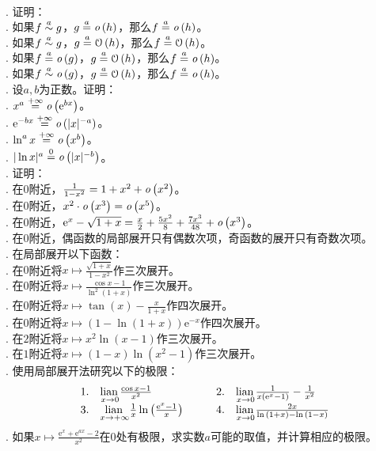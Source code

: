 \documentclass[12pt,UTF8,fontset=none]{ctexbook}
\begin{document}
\begin{xt}
    \mbox{} \\
    . 证明：\\
    . 如果$f \overset{a}{\sim} g$，$g \overset{a}{=} \mathit{o}\left(h\right)$，那么$f \overset{a}{=} \mathit{o}\left(h\right)$。\\
    . 如果$f \overset{a}{\sim} g$，$g \overset{a}{=} \mathcal{O}\left(h\right)$，那么$f \overset{a}{=} \mathcal{O}\left(h\right)$。\\
    . 如果$f \overset{a}{=} \mathit{o}\left(g\right)$，$g \overset{a}{=} \mathcal{O}\left(h\right)$，那么$f \overset{a}{=} \mathit{o}\left(h\right)$。\\
    . 如果$f \overset{a}{\sim} \mathit{o}\left(g\right)$，$g \overset{a}{=} \mathcal{O}\left(h\right)$，那么$f \overset{a}{=} \mathit{o}\left(h\right)$。\\
    . 设$a, b$为正数。证明：\\
    . $x^a \overset{+\infty}{=} \mathit{o}\left(\mathrm{e}^{bx}\right)$。\\
    . $\mathrm{e}^{-bx} \overset{+\infty}{=} \mathit{o}\left(|x|^{-a}\right)$。\\
    . $\ln^{a}{x} \overset{+\infty}{=} \mathit{o}\left(x^{b}\right)$。\\
    . $|\ln{x}|^{a} \overset{0}{=} \mathit{o}\left(|x|^{-b}\right)$。\\
    . 证明：\\
    . 在$0$附近，$\frac{1}{1 - x^2} = 1 + x^2 + \mathit{o}\left(x^2\right)$。\\
    . 在$0$附近，$x^2 \cdot \mathit{o}\left(x^3\right) = \mathit{o}\left(x^5\right)$。\\
    . 在$0$附近，$\mathrm{e}^x - \sqrt{1 + x} = \frac{x}{2} + \frac{5x^2}{8} + \frac{7x^3}{48} + \mathit{o}\left(x^3\right)$。\\
    . 在$0$附近，偶函数的局部展开只有偶数次项，奇函数的展开只有奇数次项。\\
    . 在局部展开以下函数：\\
    . 在$0$附近将$x\mapsto \frac{\sqrt{1 + x}}{1 - x^2}$作三次展开。\\
    . 在$0$附近将$x\mapsto \frac{\cos{x} - 1}{\ln^2{(1 + x)}}$作三次展开。\\
    . 在$0$附近将$x\mapsto \tan{(x)} - \frac{x}{1 + x}$作四次展开。\\
    . 在$0$附近将$x\mapsto (1 - \ln{(1 + x)})\mathrm{e}^{-x}$作四次展开。\\
    . 在$2$附近将$x\mapsto x^2\ln{(x - 1)}$作三次展开。\\
    . 在$1$附近将$x\mapsto (1 - x)\ln{(x^2 - 1)}$作三次展开。\\
    . 使用局部展开法研究以下的极限：\\
    $$
    \begin{array}{ll}
        1. \quad \underset{x\to 0}{\operatorname{lian}\,} \frac{\cos{x} - 1}{x^2} & \qquad 2. \quad \underset{x\to 0}{\operatorname{lian}\,} \frac{1}{x \left(\mathrm{e}^x - 1\right)} - \frac{1}{x^2} \\
        3. \quad \underset{x\to +\infty}{\operatorname{lian}\,} \frac{1}{x}\ln{\left(\frac{\mathrm{e}^x - 1}{x}\right)} & \qquad 4. \quad \underset{x\to 0}{\operatorname{lian}\,} \frac{2x}{\ln{(1+x)} - \ln{(1-x)}} 
    \end{array}
    $$
    . 如果$x \mapsto \frac{\mathrm{e}^{x} + \mathrm{e}^{ax} - 2}{x^2}$在$0$处有极限，求实数$a$可能的取值，并计算相应的极限。
\end{xt}
\end{document}
